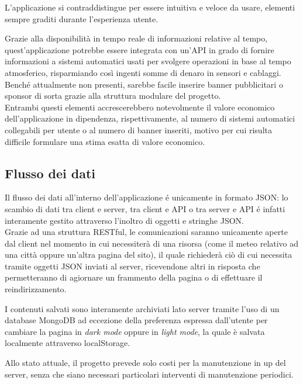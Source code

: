 L'applicazione si contraddistingue per essere intuitiva e veloce da usare, elementi sempre graditi durante l'esperienza utente.

\vspace{5mm}

Grazie alla disponibilità in tempo reale di informazioni relative al tempo, quest'applicazione potrebbe essere integrata con
un'API in grado di fornire informazioni a sistemi automatici usati per svolgere operazioni in base al tempo atmosferico,
risparmiando così ingenti somme di denaro in sensori e cablaggi.\\
Benché attualmente non presenti, sarebbe facile inserire banner pubblicitari o sponsor di sorta grazie alla struttura modulare
del progetto.\\
Entrambi questi elementi accrescerebbero notevolmente il valore economico dell'applicazione in dipendenza, rispettivamente, al
numero di sistemi automatici collegabili per utente o al numero di banner inseriti, motivo per cui risulta difficile formulare
una stima esatta di valore economico.

\subsection{Flusso dei dati}

Il flusso dei dati all'interno dell'applicazione é unicamente in formato JSON: lo scambio di dati tra client e server, tra
client e API o tra server e API é infatti interamente gestito attraverso l'inoltro di oggetti e stringhe JSON.\\
Grazie ad una struttura RESTful, le comunicazioni saranno unicamente aperte dal client nel momento in cui necessiterà di una risorsa
(come il meteo relativo ad una città oppure un'altra pagina del sito), il quale richiederà ciò di cui necessita tramite
oggetti JSON inviati al server, ricevendone altri in risposta che permetteranno di agiornare un frammento della pagina o di effettuare
il reindirizzamento.

\vspace{5mm}

I contenuti salvati sono interamente archiviati lato server tramite l'uso di un database MongoDB ad eccezione della preferenza
espressa dall'utente per cambiare la pagina in \emph{dark mode} oppure in \emph{light mode}, la quale è salvata localmente attraverso
localStorage.

\vspace{5mm}

Allo stato attuale, il progetto prevede solo costi per la manutenzione in up del server, senza che siano necessari particolari
interventi di manutenzione periodici.

